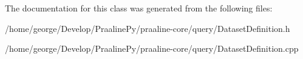 The documentation for this class was generated from the following files\+:\begin{DoxyCompactItemize}
\item 
/home/george/\+Develop/\+Praaline\+Py/praaline-\/core/query/Dataset\+Definition.\+h\item 
/home/george/\+Develop/\+Praaline\+Py/praaline-\/core/query/Dataset\+Definition.\+cpp\end{DoxyCompactItemize}
